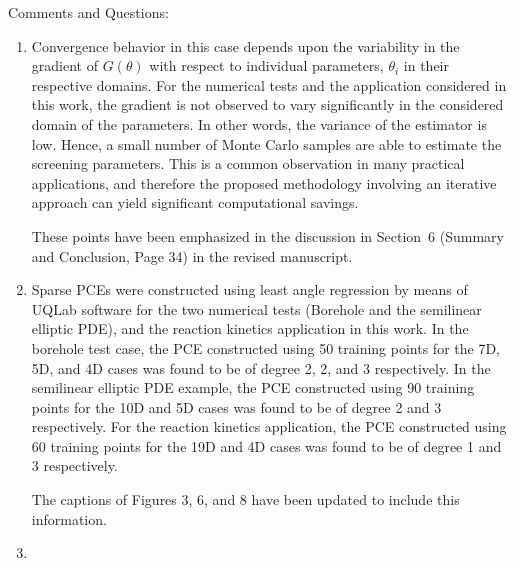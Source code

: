 \documentclass[11pt,final]{article}
\newcommand{\referee}[1]{\vspace{.1ex}\noindent{\textcolor{blue}{#1}}}
\begin{document}
Comments and Questions:
\begin{enumerate}

\item \referee{P16, Figure.2,  the estimated screening parameters eq (5) based on eq(1)
quickly converge with a small number of samples (5-10 samples). It seems that
if $\mu_i$ is based on eq(1), it will still require a reasonable amount of
samples, can authors comment on why this example converges with a small number
of samples? The same question applies to Figure 5 and Figure 7.}

Convergence behavior in this case depends upon the variability in the gradient of
$G(\theta)$ with respect to individual parameters, $\theta_i$ in their respective
domains. For the numerical tests and the application considered in this work, the
gradient is not observed to vary significantly in the considered domain of the
parameters. In other words, the variance of the estimator is low. 
Hence, a small number of Monte Carlo samples are able to estimate
the screening parameters. This is a common observation in many practical
applications, and therefore the proposed methodology involving an iterative
approach can yield significant computational savings. 

These points have been emphasized in the discussion in Section~6 (Summary and
Conclusion, Page 34) in the revised manuscript. 

\item 
\referee{P17, Figure 3, what's the degree of the PCE used in the example? The same
question applies to Figure 6 and Figure 8.}

Sparse PCEs were constructed using least angle regression by means of UQLab software
for the two numerical tests (Borehole and the semilinear elliptic PDE),
and the reaction kinetics application in this work.  
In the borehole test case, the PCE constructed using 50 training points for the 7D, 5D, and
4D cases was found to be of degree 2, 2, and 3 respectively.  
In the semilinear elliptic PDE example, the PCE constructed using 90 training
points for the 10D and 5D cases was found to be of degree 2 and 3 respectively.
For the reaction kinetics application, the PCE constructed using 60 training points
for the 19D and 4D cases was found to be of degree 1 and 3 respectively. 

The captions of Figures 3, 6, and 8 have been updated to include this information. 

\item
\referee{
P25, Figure 7, it seems that the rank of the parameters and the difference of
$\mu_s$ doesn't change too much over iterations. Does it indicate the initial
parameter screening  (line 1-6 in Algorithm 1) is good enough for ranking the
parameters? Can the authors plot the similar figure for other examples to see
if the iterative screening procedure does make a difference on the ranking the
parameters compared with the initial parameter screening step?}


\end{enumerate}
\end{document}
